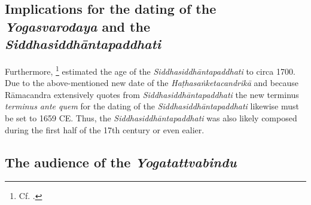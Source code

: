\subsection{Implications for the dating of the \textit{Yogasvarodaya} and the \textit{Siddhasiddhāntapaddhati}}
Furthermore, \citeauthor{mallinsononline2013}\footnote{Cf. .} estimated the age of the \textit{Siddhasiddhāntapaddhati} to circa 1700. Due to the above-mentioned new date of the \textit{Haṭhasaṅketacandrikā} and because Rāmacandra extensively quotes from \textit{Siddhasiddhāntapaddhati} the new terminus \textit{terminus ante quem} for the dating of the \textit{Siddhasiddhāntapaddhati} likewise must be set to 1659 CE. Thus, the \textit{Siddhasiddhāntapaddhati} was also likely composed during the first half of the 17th century or even ealier.

\subsection{The audience of the \textit{Yogatattvabindu}}
\label{ytbaudience}

